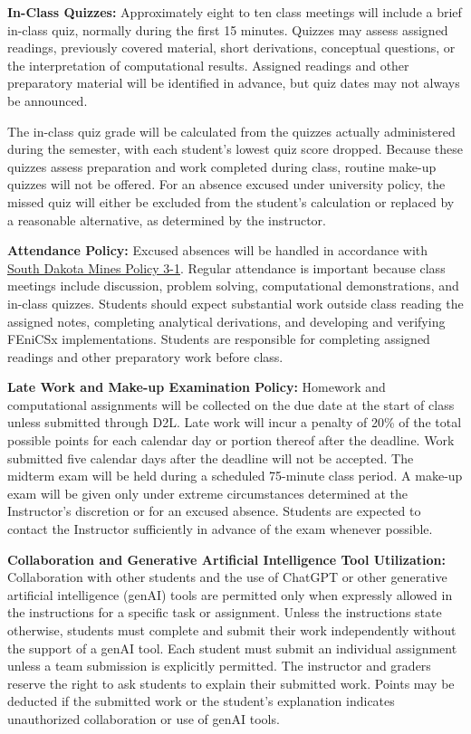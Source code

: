 \documentclass[12pt]{article}
\newcommand{\coursefield}[2]{%
  \vspace{0.2em}\noindent\textbf{#1} #2\par
}
\begin{document}
\coursefield{In-Class Quizzes:}{
Approximately eight to ten class meetings will include a brief in-class quiz, normally during the first 15 minutes. Quizzes may assess assigned readings, previously covered material, short derivations, conceptual questions, or the interpretation of computational results. Assigned readings and other preparatory material will be identified in advance, but quiz dates may not always be announced.

The in-class quiz grade will be calculated from the quizzes actually administered during the semester, with each student's lowest quiz score dropped. Because these quizzes assess preparation and work completed during class, routine make-up quizzes will not be offered. For an absence excused under university policy, the missed quiz will either be excluded from the student's calculation or replaced by a reasonable alternative, as determined by the instructor.
}

\coursefield{Attendance Policy:}{
Excused absences will be handled in accordance with \href{https://www.sdsmt.edu/about/assets/pdf-files/policy-manual/Policy\%203-1\%20Excused\%20Absences.pdf}{South Dakota Mines Policy 3-1}. Regular attendance is important because class meetings include discussion, problem solving, computational demonstrations, and in-class quizzes. Students should expect substantial work outside class reading the assigned notes, completing analytical derivations, and developing and verifying FEniCSx implementations. Students are responsible for completing assigned readings and other preparatory work before class.
}

\coursefield{Late Work and Make-up Examination Policy:}{
Homework and computational assignments will be collected on the due date at the start of class unless submitted through D2L. Late work will incur a penalty of 20\% of the total possible points for each calendar day or portion thereof after the deadline. Work submitted five calendar days after the deadline will not be accepted. The midterm exam will be held during a scheduled 75-minute class period. A make-up exam will be given only under extreme circumstances determined at the Instructor's discretion or for an excused absence. Students are expected to contact the Instructor sufficiently in advance of the exam whenever possible.
}

\coursefield{Collaboration and Generative Artificial Intelligence Tool Utilization:}{
Collaboration with other students and the use of ChatGPT or other generative artificial intelligence (genAI) tools are permitted only when expressly allowed in the instructions for a specific task or assignment. Unless the instructions state otherwise, students must complete and submit their work independently without the support of a genAI tool. Each student must submit an individual assignment unless a team submission is explicitly permitted. The instructor and graders reserve the right to ask students to explain their submitted work. Points may be deducted if the submitted work or the student's explanation indicates unauthorized collaboration or use of genAI tools.
}
\end{document}
